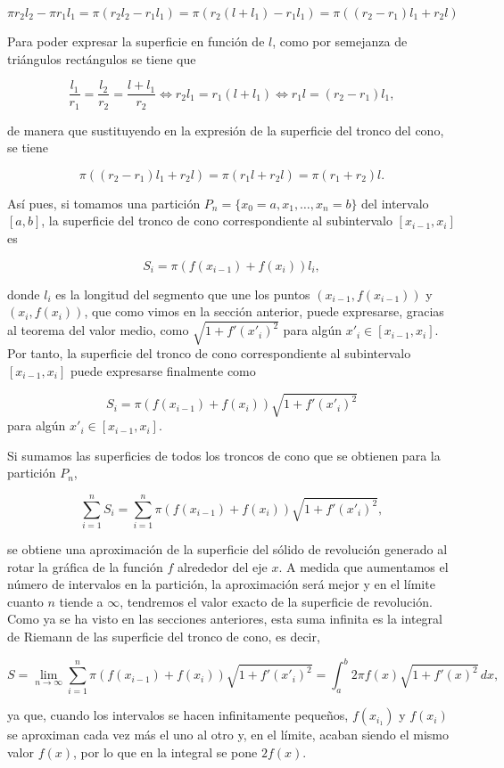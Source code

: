 \documentclass[
  a4paper,
]{scrreport}
\theoremstyle{plain}
\theoremstyle{definition}
\theoremstyle{plain}
\theoremstyle{plain}
\theoremstyle{definition}
\theoremstyle{definition}
\theoremstyle{remark}
\begin{document}
\[
\pi r_2 l_2 - \pi r_1 l_1 = \pi (r_2l_2-r_1l_1) = \pi(r_2(l+l_1)-r_1l_1) = \pi ((r_2-r_1)l_1+r_2l)
\]

Para poder expresar la superficie en función de \(l\), como por
semejanza de triángulos rectángulos se tiene que

\[
\frac{l_1}{r_1}=\frac{l_2}{r_2}=\frac{l+l_1}{r_2} \Leftrightarrow r_2l_1 = r_1(l+l_1) \Leftrightarrow r_1l = (r_2-r_1)l_1,
\]

de manera que sustituyendo en la expresión de la superficie del tronco
del cono, se tiene

\[
\pi ((r_2-r_1)l_1+r_2l) =  \pi (r_1l+r_2l) = \pi (r_1+r_2) l.
\]

Así pues, si tomamos una partición \(P_n=\{x_0=a, x_1, \ldots, x_n=b\}\)
del intervalo \([a,b]\), la superficie del tronco de cono
correspondiente al subintervalo \([x_{i-1},x_i]\) es

\[ 
S_i = \pi (f(x_{i-1})+f(x_i))l_i,
\]

donde \(l_i\) es la longitud del segmento que une los puntos
\((x_{i-1},f(x_{i-1}))\) y \((x_i,f(x_i))\), que como vimos en la
sección anterior, puede expresarse, gracias al teorema del valor medio,
como \(\sqrt{1+f'(x'_i)^2}\) para algún \(x'_i \in [x_{i-1},x_i]\). Por
tanto, la superficie del tronco de cono correspondiente al subintervalo
\([x_{i-1},x_i]\) puede expresarse finalmente como

\[
S_i = \pi (f(x_{i-1})+f(x_i))\sqrt{1+f'(x'_i)^2}
\] para algún \(x'_i\in [x_{i-1},x_i]\).

Si sumamos las superficies de todos los troncos de cono que se obtienen
para la partición \(P_n\),

\[
\sum_{i=1}^n S_i = \sum_{i=1}^n \pi (f(x_{i-1})+f(x_i))\sqrt{1+f'(x'_i)^2},
\]

se obtiene una aproximación de la superficie del sólido de revolución
generado al rotar la gráfica de la función \(f\) alrededor del eje
\(x\). A medida que aumentamos el número de intervalos en la partición,
la aproximación será mejor y en el límite cuanto \(n\) tiende a
\(\infty\), tendremos el valor exacto de la superficie de revolución.
Como ya se ha visto en las secciones anteriores, esta suma infinita es
la integral de Riemann de las superficie del tronco de cono, es decir,

\[
S = \lim_{n\to\infty} \sum_{i=1}^n \pi (f(x_{i-1})+f(x_i))\sqrt{1+f'(x'_i)^2} = \int_a^b 2 \pi f(x)\sqrt{1+f'(x)^2}\,dx,
\]

ya que, cuando los intervalos se hacen infinitamente pequeños,
\(f(x_{i_1})\) y \(f(x_i)\) se aproximan cada vez más el uno al otro y,
en el límite, acaban siendo el mismo valor \(f(x)\), por lo que en la
integral se pone \(2 f(x)\).
\end{document}
